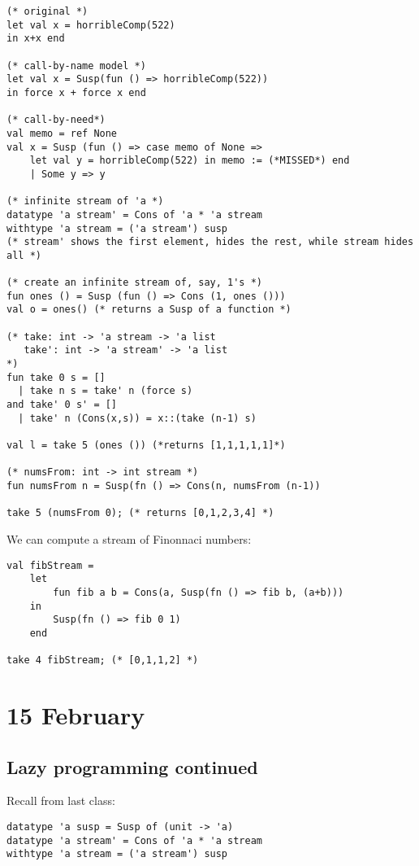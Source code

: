 \documentclass[11pt]{article}
\begin{document}
\begin{verbatim}
(* original *)
let val x = horribleComp(522)
in x+x end

(* call-by-name model *)
let val x = Susp(fun () => horribleComp(522))
in force x + force x end

(* call-by-need*)
val memo = ref None
val x = Susp (fun () => case memo of None =>
    let val y = horribleComp(522) in memo := (*MISSED*) end
    | Some y => y

(* infinite stream of 'a *)
datatype 'a stream' = Cons of 'a * 'a stream
withtype 'a stream = ('a stream') susp
(* stream' shows the first element, hides the rest, while stream hides all *)

(* create an infinite stream of, say, 1's *)
fun ones () = Susp (fun () => Cons (1, ones ()))
val o = ones() (* returns a Susp of a function *)

(* take: int -> 'a stream -> 'a list
   take': int -> 'a stream' -> 'a list
*)
fun take 0 s = []
  | take n s = take' n (force s)
and take' 0 s' = []
  | take' n (Cons(x,s)) = x::(take (n-1) s)

val l = take 5 (ones ()) (*returns [1,1,1,1,1]*)

(* numsFrom: int -> int stream *)
fun numsFrom n = Susp(fn () => Cons(n, numsFrom (n-1))

take 5 (numsFrom 0); (* returns [0,1,2,3,4] *)
\end{verbatim}

We can compute a stream of Finonnaci numbers:
\begin{verbatim}
val fibStream =
    let
        fun fib a b = Cons(a, Susp(fn () => fib b, (a+b)))
    in
        Susp(fn () => fib 0 1)
    end

take 4 fibStream; (* [0,1,1,2] *)
\end{verbatim}

\section{15 February}
\subsection{Lazy programming continued}

Recall from last class:

\begin{verbatim}
datatype 'a susp = Susp of (unit -> 'a)
datatype 'a stream' = Cons of 'a * 'a stream
withtype 'a stream = ('a stream') susp
\end{verbatim}
\end{document}
